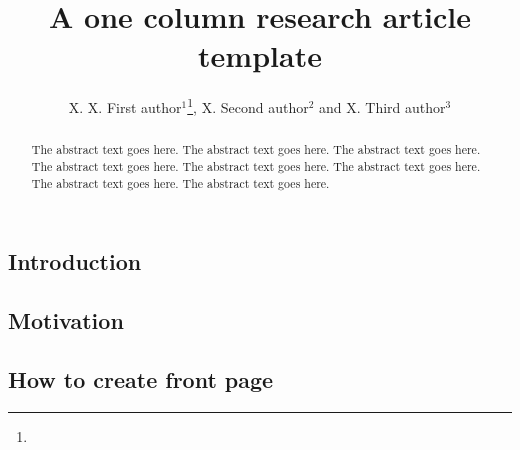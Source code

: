 \documentclass[nocrop,final,onecolumn,openacc]{bluetechreport}
\begin{document}
\title{A one column research article template}

\author{%
X. X. First author$^{1}$\footnote{}, X. Second author$^{2}$ and X. Third author$^{3}$}

\address{$^{1}$First author address\\
$^{2}$Second author address\\
$^{3}$Third author address}




\begin{abstract}
The abstract text goes here. The abstract text goes here. The abstract text goes here. The abstract text goes here.
The abstract text goes here. The abstract text goes here. The abstract text goes here. The abstract text goes here.
\end{abstract}


\begin{fmtext}

\section{Introduction}\label{sec:introduction}
\lipsum[1]
\subsection{Motivation}
\lipsum[2]
\subsection{How to create front page}
\lipsum[3-4]
\end{fmtext}

\maketitle
\clearpage
\end{document}
